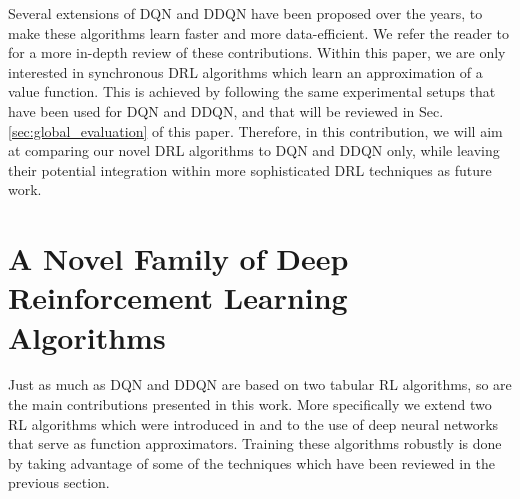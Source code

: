 Several extensions of DQN and DDQN have been proposed over the years, to make these algorithms learn faster and more data-efficient. We refer the reader to \cite{li2017deep} for a more in-depth review of these contributions. Within this paper, we are only interested in synchronous DRL algorithms which learn an approximation of a value function. This is achieved by following the same experimental setups that have been used for DQN and DDQN, and that will be reviewed in Sec. \ref{sec:global_evaluation} of this paper. Therefore, in this contribution, we will aim at comparing our novel DRL algorithms to DQN and DDQN only, while leaving their potential integration within more sophisticated DRL techniques as future work.

\section{A Novel Family of Deep Reinforcement Learning Algorithms}
\label{sec:dqv_family}

Just as much as DQN and DDQN are based on two tabular RL algorithms, so are the main contributions presented in this work. More specifically we extend two RL algorithms which were introduced in \cite{wiering2005qv} and \cite{wiering2009qv} to the use of deep neural networks that serve as function approximators. Training these algorithms robustly is done by taking advantage of some of the techniques which have been reviewed in the previous section.

